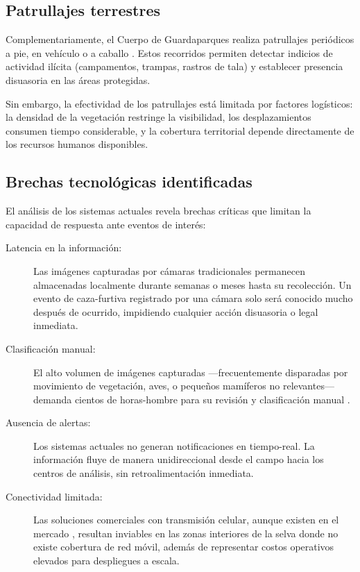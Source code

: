 \documentclass[a4paper, 12pt]{report}
\begin{document}
\subsection{Patrullajes terrestres}

Complementariamente, el Cuerpo de Guardaparques realiza patrullajes periódicos
a pie, en vehículo o a caballo \cite{ecologiamisiones2026patrullaje}. Estos
recorridos permiten detectar indicios de actividad ilícita (campamentos, trampas,
rastros de tala) y establecer presencia disuasoria en las áreas protegidas.

Sin embargo, la efectividad de los patrullajes está limitada por factores
logísticos: la densidad de la vegetación restringe la visibilidad, los
desplazamientos consumen tiempo considerable, y la cobertura territorial
depende directamente de los recursos humanos disponibles.

\subsection{Brechas tecnológicas identificadas}

El análisis de los sistemas actuales revela brechas críticas que limitan
la capacidad de respuesta ante eventos de interés:

\begin{description}
  \item[Latencia en la información:] Las imágenes capturadas por cámaras
    tradicionales permanecen almacenadas localmente durante semanas o
    meses hasta su recolección. Un evento de \gls{caza-furtiva} registrado
    por una cámara solo será conocido mucho después de ocurrido,
    impidiendo cualquier acción disuasoria o legal inmediata.
  \item[Clasificación manual:] El alto volumen de imágenes capturadas
    ---frecuentemente disparadas por movimiento de vegetación, aves, o
    pequeños mamíferos no relevantes--- demanda cientos de horas-hombre
    para su revisión y clasificación manual \cite{tabak2019machine}.
  \item[Ausencia de alertas:] Los sistemas actuales no generan notificaciones
    en \gls{tiempo-real}. La información fluye de manera unidireccional
    desde el campo hacia los centros de análisis, sin retroalimentación
    inmediata.
  \item[Conectividad limitada:] Las soluciones comerciales con transmisión
    celular, aunque existen en el mercado \cite{tactacam2024reveal,
    spypoint2024cellular}, resultan inviables en las zonas interiores de
    la selva donde no existe cobertura de red móvil, además de representar
    costos operativos elevados para despliegues a escala.
\end{description}
\end{document}
